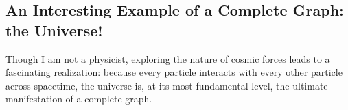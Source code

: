 \documentclass[
  12pt,
  letterpaper,
]{article}
\theoremstyle{plain}
\theoremstyle{definition}
\begin{document}
\subsection{An Interesting Example of a Complete Graph: the
Universe!}\label{an-interesting-example-of-a-complete-graph-the-universe}

Though I am not a physicist, exploring the nature of cosmic forces leads
to a fascinating realization: because every particle interacts with
every other particle across spacetime, the universe is, at its most
fundamental level, the ultimate manifestation of a complete graph.
\end{document}
